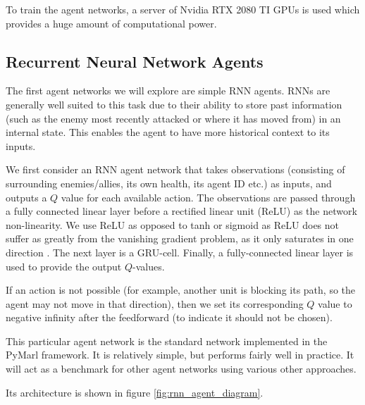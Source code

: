 To train the agent networks, a server of Nvidia RTX 2080 TI GPUs is used which provides a huge amount of computational power.




\subsection{Recurrent Neural Network Agents}



The first agent networks we will explore are simple RNN agents. RNNs are generally well suited to this task due to their ability to store past information (such as the enemy most recently attacked or where it has moved from) in an internal state. This enables the agent to have more historical context to its inputs.

We first consider an RNN agent network that takes observations (consisting of surrounding enemies/allies, its own health, its agent ID etc.) as inputs, and outputs a $Q$ value for each available action. The observations are passed through a fully connected linear layer before a rectified linear unit (ReLU) as the network non-linearity. We use ReLU as opposed to tanh or sigmoid as ReLU does not suffer as greatly from the vanishing gradient problem, as it only saturates in one direction \cite{relu}. The next layer is a GRU-cell. Finally, a fully-connected linear layer is used to provide the output $Q$-values.

If an action is not possible (for example, another unit is blocking its path, so the agent may not move in that direction), then we set its corresponding $Q$ value to negative infinity after the feedforward (to indicate it should not be chosen).

This particular agent network is the standard network implemented in the PyMarl framework. It is relatively simple, but performs fairly well in practice. It will act as a benchmark for other agent networks using various other approaches.

Its architecture is shown in figure \ref{fig:rnn_agent_diagram}.

